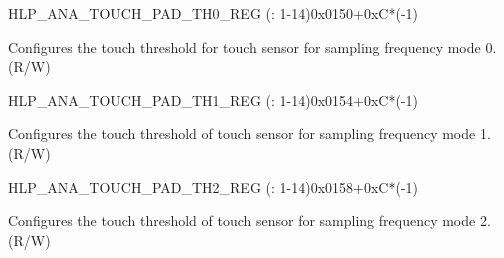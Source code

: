 \begin{register}{H}{LP\_ANA\_TOUCH\_PAD\_TH0\_REG (: 1-14)}{0x0150+0xC*(-1)}\label{regdesc:LPANATOUCHPAD0TH0REG}
%
%
\regnewline%
\begin{regdesc}\begin{reglist}
\label{fielddesc:LPANATOUCHPAD0TH0}\item [LP\_ANA\_TOUCH\_PAD\regindex{n}\_TH0] Configures the touch threshold for touch sensor  for sampling frequency mode 0. (R/W)
\end{reglist}\end{regdesc}
\end{register}


\begin{register}{H}{LP\_ANA\_TOUCH\_PAD\_TH1\_REG (: 1-14)}{0x0154+0xC*(-1)}\label{regdesc:LPANATOUCHPAD0TH1REG}
%
%
\regnewline%
\begin{regdesc}\begin{reglist}
\label{fielddesc:LPANATOUCHPAD0TH1}\item [LP\_ANA\_TOUCH\_PAD\regindex{n}\_TH1]  Configures the touch threshold of touch sensor  for sampling frequency mode 1. (R/W)
\end{reglist}\end{regdesc}
\end{register}


\begin{register}{H}{LP\_ANA\_TOUCH\_PAD\_TH2\_REG (: 1-14)}{0x0158+0xC*(-1)}\label{regdesc:LPANATOUCHPAD0TH2REG}
%
%
\regnewline%
\begin{regdesc}\begin{reglist}
\label{fielddesc:LPANATOUCHPAD0TH2}\item [LP\_ANA\_TOUCH\_PAD\regindex{n}\_TH2] Configures the touch threshold of touch sensor  for sampling frequency mode 2. (R/W)
\end{reglist}\end{regdesc}
\end{register}


